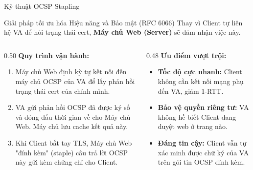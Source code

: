 \documentclass[10pt, aspectratio=169]{beamer}
\begin{document}
\begin{frame}{Kỹ thuật OCSP Stapling}
    \begin{block}{Giải pháp tối ưu hóa Hiệu năng và Bảo mật (RFC 6066)}
        Thay vì Client tự liên hệ VA để hỏi trạng thái cert, \textbf{Máy chủ Web (Server)} sẽ đảm nhận việc này.
    \end{block}
    \begin{columns}[onlytextwidth]
        \begin{column}{0.50\textwidth}
            \textbf{Quy trình vận hành:}
            \begin{enumerate}
                \item Máy chủ Web định kỳ tự kết nối đến máy chủ OCSP của VA để lấy phản hồi trạng thái cert của chính mình.
                \item VA gửi phản hồi OCSP đã được ký số và đóng dấu thời gian về cho Máy chủ Web. Máy chủ lưu cache kết quả này.
                \item Khi Client bắt tay TLS, Máy chủ Web "đính kèm" (staple) câu trả lời OCSP này gửi kèm chứng chỉ cho Client.
            \end{enumerate}
        \end{column}
        \begin{column}{0.48\textwidth}
            \textbf{Ưu điểm vượt trội:}
            \begin{itemize}
                \item \textbf{Tốc độ cực nhanh:} Client không cần kết nối mạng phụ đến VA, giảm 1-RTT.
                \item \textbf{Bảo vệ quyền riêng tư:} VA không hề biết Client đang duyệt web ở trang nào.
                \item \textbf{Đáng tin cậy:} Client vẫn tự xác minh được chữ ký của VA trên gói tin OCSP đính kèm.
            \end{itemize}
        \end{column}
    \end{columns}
\end{frame}
\end{document}
